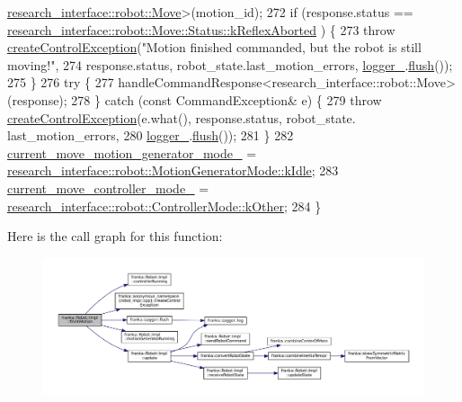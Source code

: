 \begin{DoxyCode}
      \hyperlink{structresearch__interface_1_1robot_1_1Move}{research\_interface::robot::Move}>(motion\_id);
272   \textcolor{keywordflow}{if} (response.status == \hyperlink{structresearch__interface_1_1robot_1_1Move_a74e15d249324a1b2d28f0a7cf50dc794aedb741f9f460686f7d799eb503d047f1}{research\_interface::robot::Move::Status::kReflexAborted}
      ) \{
273     \textcolor{keywordflow}{throw} \hyperlink{namespacefranka_1_1anonymous__namespace_02robot__impl_8cpp_03_ad774a35737682bade54336046f9d09b2}{createControlException}(\textcolor{stringliteral}{"Motion finished commanded, but the robot is still
       moving!"},
274                                  response.status, robot\_state.last\_motion\_errors, 
      \hyperlink{classfranka_1_1Robot_1_1Impl_a404078ee04a4786f61d991b71d2dc1ff}{logger\_}.\hyperlink{classfranka_1_1Logger_a44b15a95e25dabe93f797c1d9651fb6e}{flush}());
275   \}
276   \textcolor{keywordflow}{try} \{
277     handleCommandResponse<research\_interface::robot::Move>(response);
278   \} \textcolor{keywordflow}{catch} (\textcolor{keyword}{const} CommandException& e) \{
279     \textcolor{keywordflow}{throw} \hyperlink{namespacefranka_1_1anonymous__namespace_02robot__impl_8cpp_03_ad774a35737682bade54336046f9d09b2}{createControlException}(e.what(), response.status, robot\_state.
      last\_motion\_errors,
280                                  \hyperlink{classfranka_1_1Robot_1_1Impl_a404078ee04a4786f61d991b71d2dc1ff}{logger\_}.\hyperlink{classfranka_1_1Logger_a44b15a95e25dabe93f797c1d9651fb6e}{flush}());
281   \}
282   \hyperlink{classfranka_1_1Robot_1_1Impl_a2fecb29212c55738e284b2ba8249ad5c}{current\_move\_motion\_generator\_mode\_} = 
      \hyperlink{namespaceresearch__interface_1_1robot_abd2451eb963a1843f1eb066ebd4b06e8af5137a026a4b2f3b1c8a21cfc60dd14b}{research\_interface::robot::MotionGeneratorMode::kIdle};
283   \hyperlink{classfranka_1_1Robot_1_1Impl_ab5d1a7e855dae2453635da08440c375e}{current\_move\_controller\_mode\_} = 
      \hyperlink{namespaceresearch__interface_1_1robot_a54ee0c8bfefd2ee8a46837ca6d2b1213a341b8a8f03cf33821c46aa5c3aad4b7a}{research\_interface::robot::ControllerMode::kOther};
284 \}
\end{DoxyCode}
Here is the call graph for this function\+:
\nopagebreak
\begin{figure}[H]
\begin{center}
\leavevmode
\includegraphics[width=350pt]{classfranka_1_1Robot_1_1Impl_a024cc4b7994e164a1468b4dd222f80ab_cgraph}
\end{center}
\end{figure}
